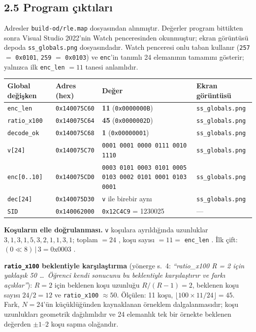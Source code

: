 \documentclass[11pt,a4paper]{article}
\newcommand{\tl}{\texttt}
\begin{document}
\subsection*{2.5 Program çıktıları}

Adresler \tl{build-od/rle.map} dosyasından alınmıştır. Değerler program bittikten sonra
Visual Studio 2022'nin Watch penceresinden okunmuştur; ekran görüntüsü depoda
\tl{ss\_globals.png} dosyasındadır. Watch penceresi onlu taban kullanır
(\tl{257} $=$ \tl{0x0101}, \tl{259} $=$ \tl{0x0103}) ve \tl{enc}'in tanımlı 24 elemanının
tamamını gösterir; yalnızca ilk \tl{enc\_len} $= 11$ tanesi anlamlıdır.

\begin{longtable}{p{3.0cm}p{2.9cm}p{6.3cm}p{2.6cm}}
\toprule
\textbf{Global değişken} & \textbf{Adres (hex)} & \textbf{Değer} & \textbf{Ekran görüntüsü}\\
\midrule
\tl{enc\_len}    & \tl{0x140075C60} & \textbf{11} \quad(\tl{0x0000000B}) & \tl{ss\_globals.png}\\
\tl{ratio\_x100} & \tl{0x140075C64} & \textbf{45} \quad(\tl{0x0000002D}) & \tl{ss\_globals.png}\\
\tl{decode\_ok}  & \tl{0x140075C68} & \textbf{1} \quad(\tl{0x00000001})  & \tl{ss\_globals.png}\\
\tl{v[24]}       & \tl{0x140075C70} & \tl{0001 0001 0000 0111 0010 1110} & \tl{ss\_globals.png}\\
\tl{enc[0..10]}  & \tl{0x140075CD0} & \tl{0003 0101 0003 0101 0005 0103 0002 0101 0001 0103 0001} & \tl{ss\_globals.png}\\
\tl{dec[24]}     & \tl{0x140075D30} & \tl{v} ile birebir aynı & \tl{ss\_globals.png}\\
\tl{SID}         & \tl{0x140062000} & \tl{0x12C4C9} = 1230025 & ---\\
\bottomrule
\end{longtable}

\textbf{Koşuların elle doğrulanması.} \tl{v} koşulara ayrıldığında uzunluklar
$3, 1, 3, 1, 5, 3, 2, 1, 1, 3, 1$; toplam $= 24$ \checkmark, koşu sayısı $= 11 =$ \tl{enc\_len}
\checkmark. İlk çift: $(0 \ll 8)\,|\,3 = \text{0x0003}$ \checkmark.

\textbf{\tl{ratio\_x100} beklentiyle karşılaştırma} (yönerge s.~4: \textit{``ratio\_x100 R = 2 için
yaklaşık 50 \dots\ Öğrenci kendi sonucunu bu beklentiyle karşılaştırır ve farkı açıklar''}):
$R = 2$ için beklenen koşu uzunluğu $R/(R-1) = 2$, beklenen koşu sayısı $24/2 = 12$ ve
\tl{ratio\_x100} $\approx 50$. Ölçülen: 11 koşu, $\lfloor 100 \times 11 / 24 \rfloor = 45$.
Fark, $N = 24$'ün küçüklüğünden kaynaklanan örneklem dalgalanmasıdır; koşu uzunlukları geometrik
dağılımlıdır ve 24 elemanlık tek bir örnekte beklenen değerden $\pm1$--$2$ koşu sapma olağandır.
\end{document}
